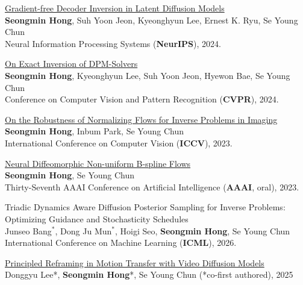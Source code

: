 \begin{cvcontent}
\href{https://smhongok.github.io/dec-inv.html}{Gradient-free Decoder Inversion in Latent Diffusion Models}\\
\textbf{Seongmin Hong}, Suh Yoon Jeon, Kyeonghyun Lee, Ernest K. Ryu, Se Young Chun\\
Neural Information Processing Systems (\textbf{NeurIPS}), 2024.

\href{https://smhongok.github.io/inv-dpm.html}{On Exact Inversion of DPM-Solvers}\\
\textbf{Seongmin Hong}, Kyeonghyun Lee, Suh Yoon Jeon, Hyewon Bae, Se Young Chun\\
Conference on Computer Vision and Pattern Recognition (\textbf{CVPR}), 2024.

\href{https://smhongok.github.io/robustness.html}{On the Robustness of Normalizing Flows for Inverse Problems in Imaging}\\
\textbf{Seongmin Hong}, Inbum Park, Se Young Chun\\
International Conference on Computer Vision (\textbf{ICCV}), 2023.

\href{https://smhongok.github.io/nubsf.html}{Neural Diffeomorphic Non-uniform B-spline Flows}\\
\textbf{Seongmin Hong}, Se Young Chun\\
Thirty-Seventh AAAI Conference on Artificial Intelligence (\textbf{AAAI}, oral), 2023.

\end{cvcontent}
\begin{cvcontent}
Triadic Dynamics Aware Diffusion Posterior Sampling for Inverse Problems: Optimizing Guidance and Stochasticity Schedules\\
Junseo Bang$^*$, Dong Ju Mun$^*$, Hoigi Seo, \textbf{Seongmin Hong}, Se Young Chun\\
International Conference on Machine Learning (\textbf{ICML}), 2026.

\end{cvcontent}
\begin{cvcontent}
    \href{https://dx.doi.org/10.2139/ssrn.5397023}{Principled Reframing in Motion Transfer with Video Diffusion Models} \\
    Donggyu Lee*, \textbf{Seongmin Hong}*, Se Young Chun (*co-first authored), 2025 \\
\end{cvcontent}

